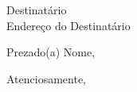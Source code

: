 \documentclass[a4paper,12pt]{letter}
\date{\today}
\begin{document}
\begin{letter}{Destinatário\\ Endereço do Destinatário}

\opening{Prezado(a) Nome,}

\lipsum[1-3]

\closing{Atenciosamente,}

\end{letter}
\end{document}
